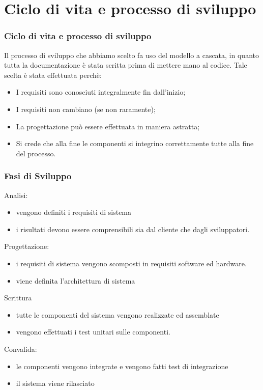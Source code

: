 \documentclass[a4paper,12pt]{beamer}
\begin{document}
\section{Ciclo di vita e processo di sviluppo}
\begin{frame}
\frametitle{Ciclo di vita e processo di sviluppo}
Il processo di sviluppo che abbiamo scelto fa uso del modello a cascata, in quanto tutta la documentazione è stata scritta prima di mettere mano al codice. Tale scelta è stata effettuata perchè:
\begin{itemize}
\item I requisiti sono conosciuti integralmente fin dall’inizio;
\item I requisiti non cambiano (se non raramente);
\item La progettazione può essere effettuata in maniera astratta;
\item Si crede che alla fine le componenti si integrino correttamente tutte alla fine del processo.
\end{itemize}
\end{frame}

\begin{frame}
\frametitle{Fasi di Sviluppo}
Analisi:
\begin{itemize}
\item vengono definiti i requisiti di sistema
\item i risultati devono essere comprensibili sia dal cliente che dagli sviluppatori.
\end{itemize}

Progettazione:
\begin{itemize}
\item i requisiti di sistema vengono scomposti in requisiti software ed hardware.
\item viene definita l’architettura di sistema
\end{itemize}

Scrittura 
\begin{itemize}
\item tutte le componenti del sistema vengono realizzate ed assemblate  
\item vengono effettuati i test unitari sulle componenti.
\end{itemize}

Convalida:
\begin{itemize}
\item le componenti vengono integrate e vengono fatti test di integrazione
\item il sistema viene rilasciato
\end{itemize}
\end{frame}
\end{document}
